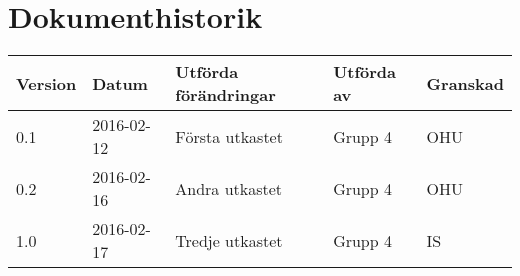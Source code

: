 \documentclass[11pt]{article}
\begin{document}
\tableofcontents

\pagebreak

\section*{Dokumenthistorik}
\begin{table}[h]
\begin{tabular}{|l|l|l|l|l|} \hline

\textbf{Version} & \textbf{Datum} & \textbf{Utförda förändringar} & \textbf{Utförda av} & \textbf{Granskad} \\ \hline
0.1 & 2016-02-12 &  Första utkastet & Grupp 4 & OHU \\ \hline
0.2 & 2016-02-16 & Andra utkastet  & Grupp 4 & OHU \\ \hline
1.0 & 2016-02-17 & Tredje utkastet  & Grupp 4 & IS \\ \hline
\end{tabular}
\end{table}

\pagebreak
{}
\end{document}
